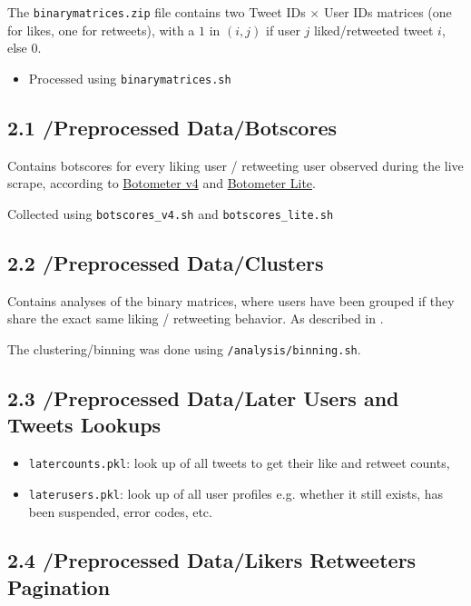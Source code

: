 \documentclass[10pt,english,sigconf,authoryear,nonacm]{article}
\begin{document}
The \texttt{binarymatrices.zip} file contains two Tweet IDs $\times$
User IDs matrices (one for likes, one for retweets), with a $1$ in
$(i,j)$ if user $j$ liked/retweeted tweet $i$, else $0$.
\begin{itemize}
\item Processed using \texttt{binarymatrices.sh}
\end{itemize}

\subsection*{2.1 /Preprocessed Data/Botscores}

Contains botscores for every liking user / retweeting user observed
during the live scrape, according to \href{https://cnets.indiana.edu/blog/2020/09/01/botometer-v4/}{Botometer v4}
and \href{https://botometer.osome.iu.edu/botometerlite}{Botometer Lite}.

Collected using \texttt{botscores\_v4.sh} and \texttt{botscores\_lite.sh}

\subsection*{2.2 /Preprocessed Data/Clusters}

Contains analyses of the binary matrices, where users have been grouped
if they share the exact same liking / retweeting behavior. As described
in \cite{JahnRendsvigTwitterLikesCIB}.

The clustering/binning was done using \texttt{/analysis/binning.sh}.

\subsection*{2.3 /Preprocessed Data/Later Users and Tweets Lookups}
\begin{itemize}
\item \texttt{latercounts.pkl}: look up of all tweets to get their like
and retweet counts,
\item \texttt{laterusers.pkl}: look up of all user profiles e.g. whether
it still exists, has been suspended, error codes, etc.
\end{itemize}

\subsection*{2.4 /Preprocessed Data/Likers Retweeters Pagination}
\end{document}
